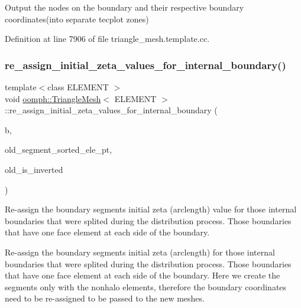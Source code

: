 Output the nodes on the boundary and their respective boundary coordinates(into separate tecplot zones) 

Definition at line 7906 of file triangle\+\_\+mesh.\+template.\+cc.

\mbox{\label{classoomph_1_1TriangleMesh_a614bf8ce3f64b37924a0b02fc5bab8eb}} 
\subsubsection{\texorpdfstring{re\+\_\+assign\+\_\+initial\+\_\+zeta\+\_\+values\+\_\+for\+\_\+internal\+\_\+boundary()}{re\_assign\_initial\_zeta\_values\_for\_internal\_boundary()}}
{\footnotesize\ttfamily template$<$class E\+L\+E\+M\+E\+NT $>$ \\
void \hyperlink{classoomph_1_1TriangleMesh}{oomph\+::\+Triangle\+Mesh}$<$ E\+L\+E\+M\+E\+NT $>$\+::re\+\_\+assign\+\_\+initial\+\_\+zeta\+\_\+values\+\_\+for\+\_\+internal\+\_\+boundary (\begin{DoxyParamCaption}\item[{const unsigned \&}]{b,  }\item[{Vector$<$ std\+::list$<$ Finite\+Element $\ast$$>$ $>$ \&}]{old\+\_\+segment\+\_\+sorted\+\_\+ele\+\_\+pt,  }\item[{std\+::map$<$ Finite\+Element $\ast$, bool $>$ \&}]{old\+\_\+is\+\_\+inverted }\end{DoxyParamCaption})}



Re-\/assign the boundary segments initial zeta (arclength) value for those internal boundaries that were splited during the distribution process. Those boundaries that have one face element at each side of the boundary. 

Re-\/assign the boundary segments initial zeta (arclength) for those internal boundaries that were splited during the distribution process. Those boundaries that have one face element at each side of the boundary. Here we create the segments only with the nonhalo elements, therefore the boundary coordinates need to be re-\/assigned to be passed to the new meshes. 

